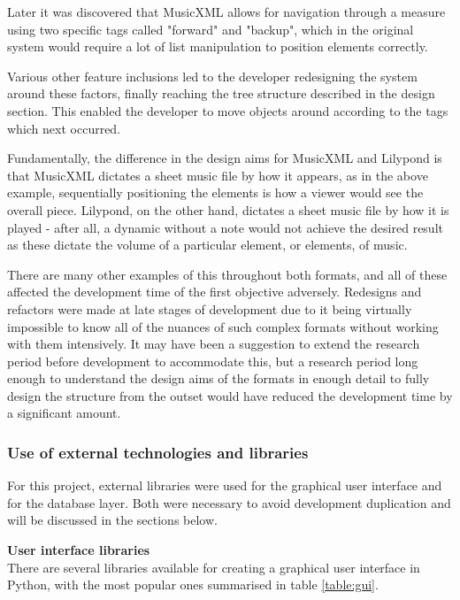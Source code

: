 Later it was discovered that MusicXML allows for navigation through a measure using two specific tags called "forward" and "backup", which in the original system would require a lot of list manipulation to position elements correctly. 

Various other feature inclusions led to the developer redesigning the system around these factors, finally reaching the tree structure described in the design section. This enabled the developer to move objects around according to the tags which next occurred.

Fundamentally, the difference in the design aims for MusicXML and Lilypond is that MusicXML dictates a sheet music file by how it appears, as in the above example, sequentially positioning the elements is how a viewer would see the overall piece. Lilypond, on the other hand, dictates a sheet music file by how it is played - after all, a dynamic without a note would not achieve the desired result as these dictate the volume of a particular element, or elements, of music. 

There are many other examples of this throughout both formats, and all of these affected the development time of the first objective adversely. Redesigns and refactors were made at late stages of development due to it being virtually impossible to know all of the nuances of such complex formats without working with them intensively. It may have been a suggestion to extend the research period before development to accommodate this, but a research period long enough to understand the design aims of the formats in enough detail to fully design the structure from the outset would have reduced the development time by a significant amount.

\subsubsection{Use of external technologies and libraries}
For this project, external libraries were used for the graphical user interface and for the database layer. Both were necessary to avoid development duplication and will be discussed in the sections below.

\textbf{User interface libraries} \\
There are several libraries available for creating a graphical user interface in Python, with the most popular ones summarised in table \ref{table:gui}.

